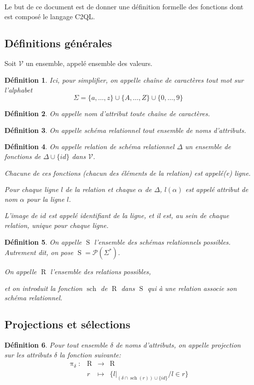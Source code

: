 \documentclass[french]{article}
\DeclareMathOperator{\proj}{\pi}
\DeclareMathOperator{\R}{R}
\DeclareMathOperator{\Sc}{S}
\DeclareMathOperator{\s}{sch}
\newcommand{\projDelta}{\proj_{\delta}}
\newcommand{\val}{\mathcal{V}}
\newtheorem{defi}{Définition}
\begin{document}
Le but de ce document est de donner une définition
formelle des fonctions dont est composé le langage C2QL.

\subsection*{Définitions générales}
Soit $\val$ un ensemble, appelé ensemble des valeurs.
\begin{defi}
	Ici, pour simplifier, on appelle chaîne de caractères
	tout mot sur l'alphabet 
	$$
	\Sigma = \{a, \dots, z\} \cup \{A, \dots, Z \} \cup \{0, \dots,  9 \}
 	$$
\end{defi}

\begin{defi}
	On appelle \emph{nom d'attribut} toute chaîne de caractères.
\end{defi}	

\begin{defi}
	On appelle \emph{schéma relationnel} tout ensemble
	de noms d'attributs.
\end{defi}

\begin{defi}
	On appelle \emph{relation} de schéma relationnel $\Delta$
	un ensemble de fonctions de $\Delta \cup \{ id \}$ dans $\val$.
	
	Chacune de ces fonctions (chacun des éléments de la relation)
	est appelé(e) \emph{ligne}.
	
	Pour chaque ligne $l$ de la relation et chaque $\alpha$ de $\Delta$,
	$l(\alpha)$ est appelé \emph{attribut} de \emph{nom} $\alpha$ pour la ligne $l$.
	
	L'image de $id$ est appelé \emph{identifiant de la ligne}, et il est, au sein de chaque
	relation, unique pour chaque ligne.
\end{defi}

\begin{defi}
	On appelle $\Sc$ l'ensemble des schémas relationnels possibles.
	Autrement dit, on pose  $\Sc = \mathcal{P}\left( \Sigma^* \right)$.
	
	On appelle $\R$ l'ensemble des relations possibles,
	
	et on introduit la fonction $\s$ de $\R$ dans
	$\Sc$
	qui à une relation associe son schéma relationnel.
\end{defi}

\subsection*{Projections et sélections}
\begin{defi}
	Pour tout ensemble $\delta$ de noms d'attributs,
	on appelle \emph{projection sur les attributs $\delta$}
	la fonction suivante:
	$$
	\begin{array}{llcl}
	\projDelta:	& \R 	& \rightarrow 	& \R \\
				& r		& \mapsto		& 
					\{{l|}_{(\delta\cap \s(r)) \cup \{id\}} / l \in r \}
	\end{array}
	$$
\end{defi}
\end{document}
